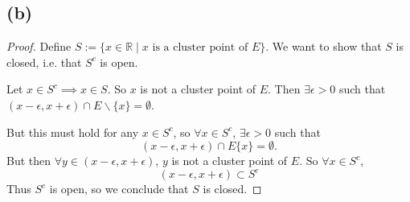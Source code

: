 \documentclass{article}
\begin{document}
\subsection*{(b)}
\begin{proof}
	Define $S:=\{x\in\mathbb{R} \;|\; x \textrm{ is a cluster point of } E\}$. We want to show that $S$ is closed, i.e. that $S^c$ is open.
	
	Let $x\in S^c \implies x \in S$. So $x$ is not a cluster point of $E$. Then $\exists \epsilon>0$ such that $(x-\epsilon, x+\epsilon)\cap E\backslash\{x\}=\emptyset$.
	
	But this must hold for any $x\in S^c$, so $\forall x \in S^c$, $\exists \epsilon>0$ such that 
	\begin{equation}
		(x-\epsilon, x+\epsilon)\cap E \{x\} = \emptyset.
	\end{equation}
	But then $\forall y \in (x-\epsilon, x + \epsilon)$, $y$ is not a cluster point of $E$. So $\forall x \in S^c$, 
	\begin{equation}
		(x-\epsilon, x+\epsilon)\subset S^c
	\end{equation}
	Thus $S^c$ is open, so we conclude that $S$ is closed.
\end{proof}
\end{document}
